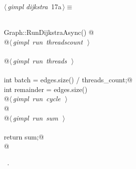 \documentclass[12pt]{article}
\begin{document}
\begin{flushleft} \small
\begin{minipage}{\linewidth}\label{scrap27}\raggedright\small
{} $\langle\,${\itshape gimpl dijkstra}\nobreak\ {\footnotesize {17a}}$\,\rangle\equiv$
\vspace{-1ex}
\begin{list}{}{} \item
\mbox{}\verb@@\\
\mbox{}\verb@double Graph::RunDijkstraAsync() {@\\
\mbox{}\verb@    @\hbox{$\langle\,${\itshape gimpl run threadscount}\nobreak\ {\footnotesize {}}$\,\rangle$}\verb@@\\
\mbox{}\verb@@\\
\mbox{}\verb@    @\hbox{$\langle\,${\itshape gimpl run threads}\nobreak\ {\footnotesize {}}$\,\rangle$}\verb@@\\
\mbox{}\verb@@\\
\mbox{}\verb@    int batch = edges.size() / threads_count;@\\
\mbox{}\verb@    int remainder = edges.size() % threads_count;@\\
\mbox{}\verb@@\\
\mbox{}\verb@    @\hbox{$\langle\,${\itshape gimpl run cycle}\nobreak\ {\footnotesize {}}$\,\rangle$}\verb@@\\
\mbox{}\verb@    @\\
\mbox{}\verb@    @\hbox{$\langle\,${\itshape gimpl run sum}\nobreak\ {\footnotesize {}}$\,\rangle$}\verb@@\\
\mbox{}\verb@@\\
\mbox{}\verb@    return sum;@\\
\mbox{}\verb@} @\\
\mbox{}\verb@@{\NWsep}
\end{list}
\vspace{-1.5ex}
\footnotesize
\begin{list}{}{\setlength{\itemsep}{-\parsep}\setlength{\itemindent}{-\leftmargin}}
\item \NWtxtMacroRefIn\ .

\item{}
\end{list}
\end{minipage}\vspace{4ex}
\end{flushleft}
\end{document}
